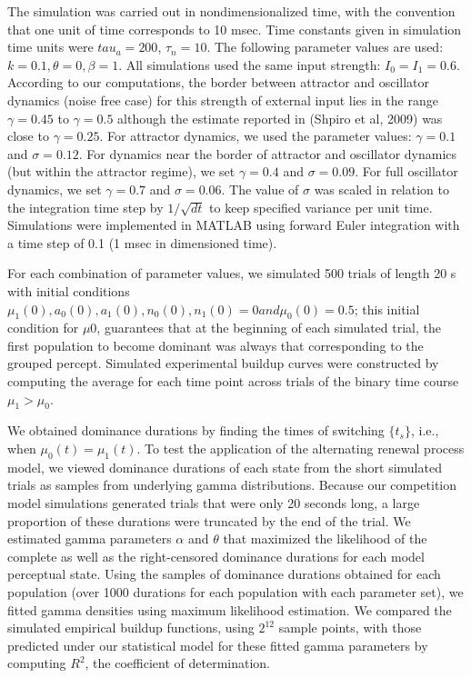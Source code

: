 The simulation was carried out in nondimensionalized time, with the convention that one unit of time corresponds to 10 msec. Time constants given in simulation time units were $tau_a = 200$, $\tau_n = 10$. The following parameter values are used: $k = 0.1, \theta = 0, \beta = 1$. All simulations used the same input strength: $I_0= I_1=0.6$. According to our computations, the border between attractor and oscillator dynamics (noise free case) for this strength of external input lies in the range $\gamma=0.45$ to  $\gamma=0.5$ although the estimate reported in (Shpiro et al, 2009) was close to $\gamma= 0.25$. For attractor dynamics, we used the parameter values: $\gamma = 0.1$ and $\sigma =0.12$. For dynamics near the border of attractor and oscillator dynamics (but within the attractor regime), we set $\gamma = 0.4$ and $\sigma = 0.09$. For full oscillator dynamics, we set $\gamma = 0.7$ and $\sigma = 0.06$. The value of $\sigma$ was scaled in relation to the integration time step by $1/\sqrt{dt}$ to keep specified variance per unit time. Simulations were implemented in MATLAB using forward Euler integration with a time step of 0.1 (1 msec in dimensioned time).

For each combination of parameter values, we simulated 500 trials of length 20 s with initial conditions $\mu_1 (0), a_0 (0), a_1 (0), n_0 (0), n_1 (0) = 0 and \mu_0 (0) = 0.5$; this initial condition for $\mu0$, guarantees that at the beginning of each simulated trial, the first population to become dominant was always that corresponding to the grouped percept. Simulated experimental buildup curves were constructed by computing the average for each time point across trials of the binary time course $\mu_1  > \mu_0$.

We obtained dominance durations by finding the times of switching $\{t_s\}$, i.e., when $\mu_0 (t)= \mu_1 (t)$.  To test the application of the alternating renewal process model, we viewed dominance durations of each state from the short simulated trials as samples from underlying gamma distributions. Because our competition model simulations generated trials that were only 20 seconds long, a large proportion of these durations were truncated by the end of the trial. We estimated gamma parameters $\alpha$ and $\theta$ that maximized the likelihood of the complete as well as the right-censored dominance durations for each model perceptual state. Using the samples of dominance durations obtained for each population (over 1000 durations for each population with each parameter set), we fitted gamma densities using maximum likelihood estimation. We compared the simulated empirical buildup functions, using $2^{12}$ sample points, with those predicted under our statistical model for these fitted gamma parameters by computing $R^2$, the coefficient of determination.

